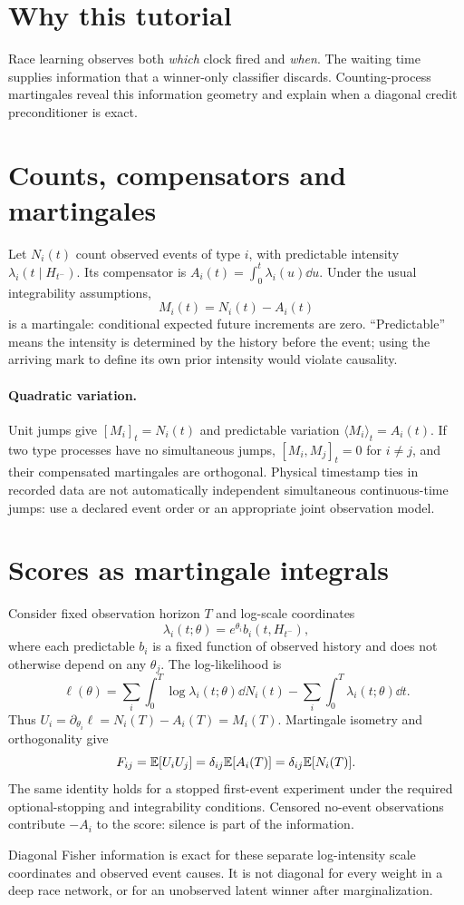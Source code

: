\documentclass[11pt]{article}
\begin{document}
\section*{Why this tutorial}
Race learning observes both \emph{which} clock fired and \emph{when}. The waiting time supplies information that a winner-only classifier discards. Counting-process martingales reveal this information geometry and explain when a diagonal credit preconditioner is exact.
\section{Counts, compensators and martingales}
Let $N_i(t)$ count observed events of type $i$, with predictable intensity $\lambda_i(t\mid H_{t^-})$. Its compensator is $A_i(t)=\int_0^t\lambda_i(u)\dd u$. Under the usual integrability assumptions,
\[
 M_i(t)=N_i(t)-A_i(t)
\]
is a martingale: conditional expected future increments are zero. ``Predictable'' means the intensity is determined by the history before the event; using the arriving mark to define its own prior intensity would violate causality.
\paragraph{Quadratic variation.} Unit jumps give $[M_i]_t=N_i(t)$ and predictable variation $\langle M_i\rangle_t=A_i(t)$. If two type processes have no simultaneous jumps, $[M_i,M_j]_t=0$ for $i\ne j$, and their compensated martingales are orthogonal. Physical timestamp ties in recorded data are not automatically independent simultaneous continuous-time jumps: use a declared event order or an appropriate joint observation model.
\section{Scores as martingale integrals}
Consider fixed observation horizon $T$ and log-scale coordinates
\[
 \lambda_i(t;\theta)=e^{\theta_i}b_i(t,H_{t^-}),
\]
where each predictable $b_i$ is a fixed function of observed history and does not otherwise depend on any $\theta_j$. The log-likelihood is
\[
 \ell(\theta)=\sum_i\int_0^T\log\lambda_i(t;\theta)\dd N_i(t)
 -\sum_i\int_0^T\lambda_i(t;\theta)\dd t.
\]
Thus $U_i=\partial_{\theta_i}\ell=N_i(T)-A_i(T)=M_i(T)$. Martingale isometry and orthogonality give
\[
 F_{ij}=\mathbb{E}[U_iU_j]=\delta_{ij}\mathbb{E}[A_i(T)]
 =\delta_{ij}\mathbb{E}[N_i(T)].
\]
The same identity holds for a stopped first-event experiment under the required optional-stopping and integrability conditions. Censored no-event observations contribute $-A_i$ to the score: silence is part of the information.
\begin{keyidea}
Diagonal Fisher information is exact for these separate log-intensity scale coordinates and observed event causes. It is not diagonal for every weight in a deep race network, or for an unobserved latent winner after marginalization.
\end{keyidea}
\end{document}

